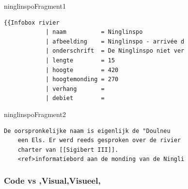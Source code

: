 \begin{saveblock}{ninglinspoFragment1}
    \begin{Verbatim}[tabsize=4,gobble=4]
    {{Infobox rivier
            | naam          = Ninglinspo
            | afbeelding    = Ninglinspo - arrivée d
            | onderschrift  = De Ninglinspo niet ver
            | lengte        = 15
            | hoogte        = 420
            | hoogtemonding = 270
            | verhang       = 
            | debiet        = 
    \end{Verbatim}
\end{saveblock}

\begin{saveblock}{ninglinspoFragment2}
    \begin{Verbatim}[tabsize=4,gobble=8]
    De oorspronkelijke naam is eigenlijk de "Doulneu
    een Els. Er werd reeds gesproken over de rivier
    charter van [[Sigibert III]].
    <ref>informatiebord aan de monding van de Ningli
    \end{Verbatim}
\end{saveblock}

\begin{frame}
    \frametitle{Code vs \lang,Visual,Visueel,}

    \vspace{5pt}

\end{frame}

